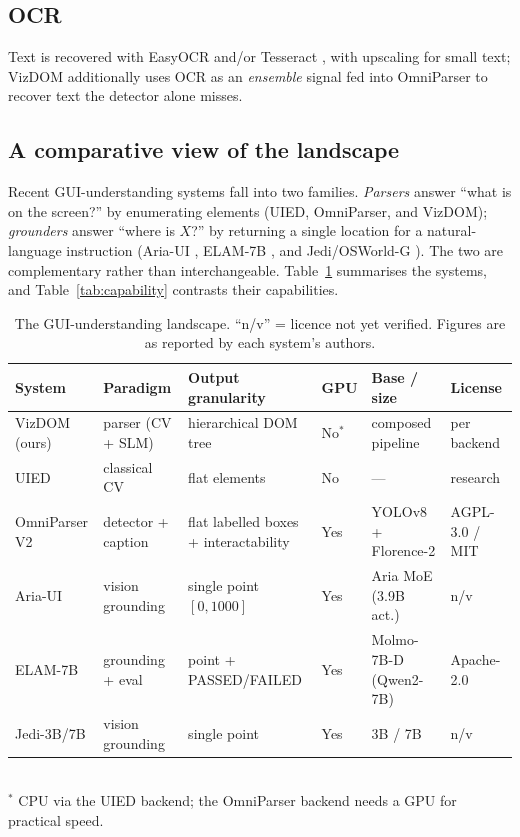 \documentclass[11pt,a4paper]{article}
\begin{document}
\subsection{OCR}
Text is recovered with EasyOCR \cite{easyocr} and/or Tesseract \cite{tesseract},
with upscaling for small text; VizDOM additionally uses OCR as an \emph{ensemble}
signal fed into OmniParser to recover text the detector alone misses.

\subsection{A comparative view of the landscape}
Recent GUI-understanding systems fall into two families. \emph{Parsers} answer
``what is on the screen?'' by enumerating elements (UIED, OmniParser, and VizDOM);
\emph{grounders} answer ``where is $X$?'' by returning a single location for a
natural-language instruction (Aria-UI \cite{ariaui2024}, ELAM-7B \cite{elam7b}, and
Jedi/OSWorld-G \cite{osworldg}). The two are complementary rather than
interchangeable. Table~\ref{tab:models} summarises the systems, and
Table~\ref{tab:capability} contrasts their capabilities.

\begin{table}[H]
  \centering\footnotesize
  \caption{The GUI-understanding landscape. ``n/v'' = licence not yet verified.
  Figures are as reported by each system's authors.}
  \label{tab:models}
  \begin{tabular}{@{}p{2.4cm}p{2.5cm}p{2.7cm}p{0.8cm}p{2.3cm}p{2.0cm}@{}}
    \toprule
    System & Paradigm & Output granularity & GPU & Base / size & License \\
    \midrule
    VizDOM (ours) & parser (CV + SLM) & hierarchical DOM tree & No$^\ast$ & composed pipeline & per backend \\
    UIED & classical CV & flat elements & No & --- & research \\
    OmniParser V2 & detector + caption & flat labelled boxes + interactability & Yes & YOLOv8 + Florence-2 & AGPL-3.0 / MIT \\
    Aria-UI & vision grounding & single point $[0,1000]$ & Yes & Aria MoE (3.9B act.) & n/v \\
    ELAM-7B & grounding + eval & point + PASSED/FAILED & Yes & Molmo-7B-D (Qwen2-7B) & Apache-2.0 \\
    Jedi-3B/7B & vision grounding & single point & Yes & 3B / 7B & n/v \\
    \bottomrule
  \end{tabular}\\[0.3em]
  {\footnotesize $^\ast$ CPU via the UIED backend; the OmniParser backend needs a GPU for practical speed.}
\end{table}
\end{document}
